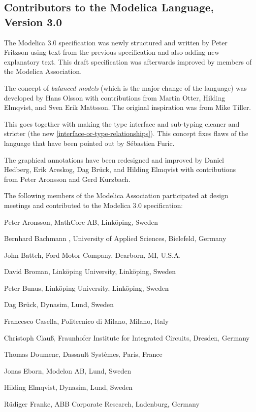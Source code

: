 \subsection{Contributors to the Modelica Language, Version 3.0}

The Modelica 3.0 specification was newly structured and written by Peter
Fritzson using text from the previous specification and also adding new
explanatory text. This draft specification was afterwards improved by
members of the Modelica Association.

The concept of \emph{balanced models} (which is the major change of the
language) was developed by Hans Olsson with contributions from Martin
Otter, Hilding Elmqvist, and Sven Erik Mattsson. The original
inspiration was from Mike Tiller.

This goes together with making the type interface and sub-typing cleaner
and stricter (the new \autoref{interface-or-type-relationships}). This concept fixes flaws of the
language that have been pointed out by Sébastien Furic.

The graphical annotations have been redesigned and improved by Daniel
Hedberg, Erik Areskog, Dag Brück, and Hilding Elmqvist with
contributions from Peter Aronsson and Gerd Kurzbach.

The following members of the Modelica Association participated at design
meetings and contributed to the Modelica 3.0 specification:

Peter Aronsson, MathCore AB, Linköping, Sweden

Bernhard Bachmann , University of Applied Sciences, Bielefeld, Germany

John Batteh, Ford Motor Company, Dearborn, MI, U.S.A.

David Broman, Linköping University, Linköping, Sweden

Peter Bunus, Linköping University, Linköping, Sweden

Dag Brück, Dynasim, Lund, Sweden

Francesco Casella, Politecnico di Milano, Milano, Italy

Christoph Clauß, Fraunhofer Institute for Integrated Circuits, Dresden,
Germany

Thomas Doumenc, Dassault Systèmes, Paris, France

Jonas Eborn, Modelon AB, Lund, Sweden

Hilding Elmqvist, Dynasim, Lund, Sweden

Rüdiger Franke, ABB Corporate Research, Ladenburg, Germany

